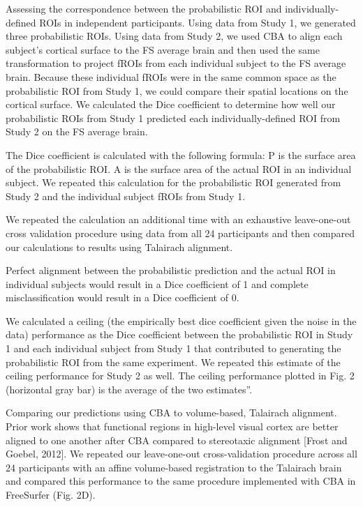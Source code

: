 Assessing the correspondence between the probabilistic ROI and
individually-defined ROIs in independent participants.
%
Using data from Study 1, we generated three probabilistic ROIs.
%
Using data from Study 2, we used CBA to align each subject's cortical surface to
the FS average brain and then used the same transformation to project fROIs from
each individual subject to the FS average brain.
%
Because these individual fROIs were in the same common space as the
probabilistic ROI from Study 1, we could compare their spatial locations on the
cortical surface.
%
We calculated the Dice coefficient to determine how well our probabilistic ROIs
from Study 1 predicted each individually-defined ROI from Study 2 on the FS
average brain.

%
The Dice coefficient is calculated with the following formula:
%
P is the surface area of the probabilistic ROI.
%
A is the surface area of the actual ROI in an individual subject.
%
We repeated this calculation for the probabilistic ROI generated from Study 2
and the individual subject fROIs from Study 1.

%
We repeated the calculation an additional time with an exhaustive leave-one-out
cross validation procedure using data from all 24 participants and then compared
our calculations to results using Talairach alignment.

%
Perfect alignment between the probabilistic prediction and the actual ROI in
individual subjects would result in a Dice coefficient of 1 and complete
misclassification would result in a Dice coefficient of 0.

%
We calculated a ceiling (the empirically best dice coefficient given the noise
in the data) performance as the Dice coefficient between the probabilistic ROI
in Study 1 and each individual subject from Study 1 that contributed to
generating the probabilistic ROI from the same experiment.
%
We repeated this estimate of the ceiling performance for Study 2 as well.
%
The ceiling performance plotted in Fig. 2 (horizontal gray bar) is the average
of the two estimates''.

Comparing our predictions using CBA to volume-based, Talairach alignment.
%
Prior work shows that functional regions in high-level visual cortex are better
aligned to one another after CBA compared to stereotaxic alignment [Frost and
Goebel, 2012].
%
We repeated our leave-one-out cross-validation procedure across all 24
participants with an affine volume-based registration to the Talairach brain and
compared this performance to the same procedure implemented with CBA in
FreeSurfer (Fig. 2D).

